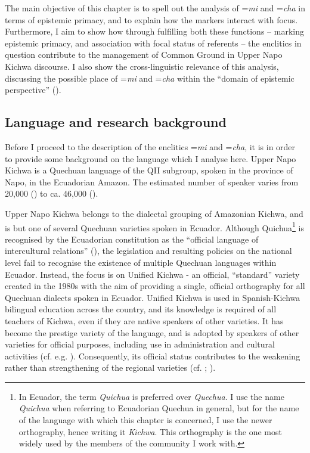 \documentclass[output=paper]{langscibook}
\begin{document}
The main objective of this chapter is to spell out the analysis of =\textit{mi} and =\textit{cha} in terms of epistemic primacy, and to explain how the markers interact with focus. Furthermore, I aim to show how through fulfilling both these functions – marking epistemic primacy, and association with focal status of referents – the enclitics in question contribute to the management of Common Ground in Upper Napo Kichwa discourse. I also show the cross-linguistic relevance of this analysis, discussing the possible place of =\textit{mi} and =\textit{cha} within the “domain of  epistemic perspective” (\citealt{Bergqvist2017}).


\subsection{Language and research background}\label{s:kg1-2}

Before I proceed to the description of the enclitics =\textit{mi} and =\textit{cha}, it is in order to provide some background on the language which I analyse here. Upper Napo Kichwa is a Quechuan language of the QII subgroup, spoken in the province of Napo, in the Ecuadorian Amazon. The estimated number of speaker varies from 20,000 (\citealt{Ethnologue2016}) to ca. 46,000 (\citealt{INEC2010}).

Upper Napo Kichwa belongs to the dialectal grouping of Amazonian Kichwa, and is but one of several Quechuan varieties spoken in Ecuador. Although Quichua\footnote{In Ecuador, the term \textit{Quichua} is preferred over \textit{Quechua}. I use the name \textit{Quichua} when referring to Ecuadorian Quechua in general, but for the name of the language with which this chapter is concerned, I use the newer orthography, hence writing it \textit{Kichwa}. This orthography is the one most widely used by the members of the community I work with.} is recognised by the Ecuadorian constitution as the “official language of intercultural relations” (\citealt{ANCE2008}), the legislation and resulting policies on the national level fail to recognise the existence of multiple Quechuan languages within Ecuador.
Instead, the focus is on Unified Kichwa - an official, “standard” variety created in the 1980s with the aim of providing a single, official orthography for all Quechuan dialects spoken in Ecuador.
Unified Kichwa is used in Spanish-Kichwa bilingual education across the country, and its knowledge is required of all teachers of Kichwa, even if they are native speakers of other varieties. It has become the prestige variety of the language, and is adopted by speakers of other varieties for official purposes, including use in administration and cultural activities (cf. e.g. \citealt{Wroblewski2014}). Consequently, its official status contributes to the weakening rather than strengthening of the regional varieties (cf. \citealt{Hornberger1996}; \citealt{Grzech2017}).
\end{document}
